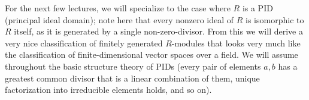 \documentclass[10pt]{article}
\begin{document}
For the next few lectures, we will specialize to the case where $R$ is a
PID (principal ideal domain); note here that every nonzero ideal of $R$
is isomorphic to $R$ itself, as it is generated by a single
non-zero-divisor. From this we will derive a very nice classification of
finitely generated $R$-modules that looks very much like the
classification of finite-dimensional vector spaces over a field. We will
assume throughout the basic structure theory of PIDs (every pair of
elements $a,b$ has a greatest common divisor that is a linear
combination of them, unique factorization into irreducible elements
holds, and so on).
\end{document}
